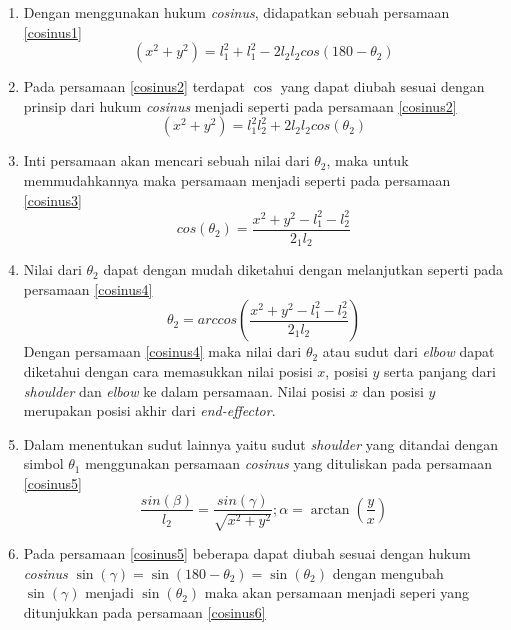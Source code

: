 \begin{enumerate}
	\item Dengan menggunakan hukum \textit{cosinus}, didapatkan sebuah persamaan \ref{cosinus1}
	\begin{equation}
	(x^2+y^2)=l_{1}^2+l_{1}^2-2l_{2}l_{2}cos(180-\theta_{2})
	\label{cosinus1}
	\end{equation}
	\item Pada persamaan \ref{cosinus2} terdapat $\cos$ yang dapat diubah sesuai dengan prinsip dari hukum \textit{cosinus} menjadi seperti pada persamaan \ref{cosinus2}
	\begin{equation}
	(x^2+y^2)=l_{1}^2l_{2}^2+2l_{2}l_{2}cos(\theta_{2})
	\label{cosinus2}
	\end{equation}
	\item Inti persamaan akan mencari sebuah nilai dari $\theta_{2}$, maka untuk memmudahkannya maka persamaan menjadi seperti pada persamaan \ref{cosinus3}
	\begin{equation}
	cos(\theta_{2})=\frac{x^2+y^2-l_{1}^2-l_{2}^2}{2_{1}l_{2}}
	\label{cosinus3}
	\end{equation}
	\item Nilai dari $\theta_{2}$ dapat dengan mudah diketahui dengan melanjutkan seperti pada persamaan \ref{cosinus4}
	\begin{equation}
	\theta_{2}=arccos(\frac{x^2+y^2-l_{1}^2-l_{2}^2}{2_{1}l_{2}})
		\label{cosinus4}
	\end{equation}
	Dengan persamaan \ref{cosinus4} maka nilai dari $\theta_{2}$ atau sudut dari \textit{elbow} dapat diketahui dengan cara memasukkan nilai posisi $x$, posisi $y$ serta panjang dari \textit{shoulder} dan \textit{elbow} ke dalam persamaan. Nilai posisi $x$ dan posisi $y$ merupakan posisi akhir dari \textit{end-effector}. 
	\item Dalam menentukan sudut lainnya yaitu sudut \textit{shoulder} yang ditandai dengan simbol $\theta_{1}$ menggunakan persamaan \textit{cosinus} yang dituliskan pada persamaan \ref{cosinus5}
	\begin{equation}
	\frac{sin(\beta)}{l_{2}} = \frac{sin(\gamma)}{\sqrt{x^2+y^2}} ; \alpha=\arctan(\frac{y}{x})
	\label{cosinus5}
	\end{equation}
	\item Pada persamaan \ref{cosinus5} beberapa dapat diubah sesuai dengan hukum \textit{cosinus} $\sin(\gamma)=\sin(180-\theta_{2})=\sin(\theta_{2})$ dengan mengubah $\sin(\gamma)$ menjadi $\sin(\theta_{2})$ maka akan persamaan menjadi seperi yang ditunjukkan pada persamaan \ref{cosinus6}

\end{enumerate}
